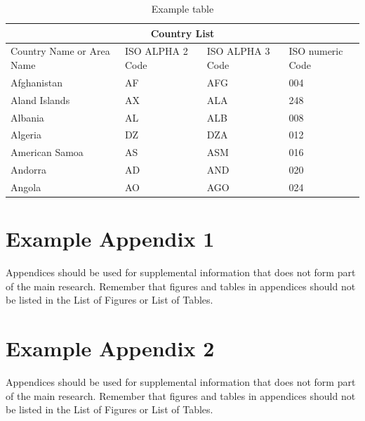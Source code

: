 \documentclass{imc-inf}
\begin{document}
\begin{table}[ht]
\begin{tabular}{ |p{3cm}||p{3cm}|p{3cm}|p{3cm}|  }
	\hline
	\multicolumn{4}{|c|}{Country List} \\
	\hline
	Country Name     or Area Name& ISO ALPHA 2 Code &ISO ALPHA 3 Code&ISO numeric Code\\
	\hline
	Afghanistan   & AF    &AFG&   004\\
	Aland Islands&   AX  & ALA   &248\\
	Albania &AL & ALB&  008\\
	Algeria    &DZ & DZA&  012\\
	American Samoa&   AS  & ASM&016\\
	Andorra& AD  & AND   &020\\
	Angola& AO  & AGO&024\\
	\hline
\end{tabular}
\caption{\label{tab:table-name}Example table}
\end{table}



%
%
%
%
%

\backmatter%
	
 \typeout{}
	
	

\begin{appendices} %
\chapter{Example Appendix 1}

Appendices should be used for supplemental information that does not form part of the main research. Remember that figures and tables in appendices should not be listed in the List of Figures or List of Tables. 

\chapter{Example Appendix 2}

Appendices should be used for supplemental information that does not form part of the main research. Remember that figures and tables in appendices should not be listed in the List of Figures or List of Tables. 
	
\end{appendices}
\end{document}
